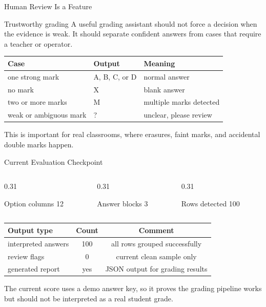 \documentclass[aspectratio=169]{beamer}
\newcommand{\metric}[2]{%
  \begin{block}{#1}
    \centering\Large #2
  \end{block}
}
\begin{document}
\begin{frame}{Human Review Is a Feature}
  \begin{block}{Trustworthy grading}
    A useful grading assistant should not force a decision when the evidence is weak. It should separate confident answers from cases that require a teacher or operator.
  \end{block}

  \begin{table}
    \centering
    \begin{tabular}{lll}
      \toprule
      Case & Output & Meaning \\
      \midrule
      one strong mark & A, B, C, or D & normal answer \\
      no mark & X & blank answer \\
      two or more marks & M & multiple marks detected \\
      weak or ambiguous mark & ? & unclear, please review \\
      \bottomrule
    \end{tabular}
  \end{table}

  \vspace{0.1cm}
  \small This is important for real classrooms, where erasures, faint marks, and accidental double marks happen.
\end{frame}

\begin{frame}{Current Evaluation Checkpoint}
  \begin{columns}[T]
    \begin{column}{0.31\textwidth}
      \metric{Option columns}{12}
    \end{column}
    \begin{column}{0.31\textwidth}
      \metric{Answer blocks}{3}
    \end{column}
    \begin{column}{0.31\textwidth}
      \metric{Rows detected}{100}
    \end{column}
  \end{columns}

  \vspace{0.2cm}

  \begin{table}
    \centering
    \begin{tabular}{lcc}
      \toprule
      Output type & Count & Comment \\
      \midrule
      interpreted answers & 100 & all rows grouped successfully \\
      review flags & 0 & current clean sample only \\
      generated report & yes & JSON output for grading results \\
      \bottomrule
    \end{tabular}
  \end{table}

  \small The current score uses a demo answer key, so it proves the grading pipeline works but should not be interpreted as a real student grade.
\end{frame}
\end{document}
